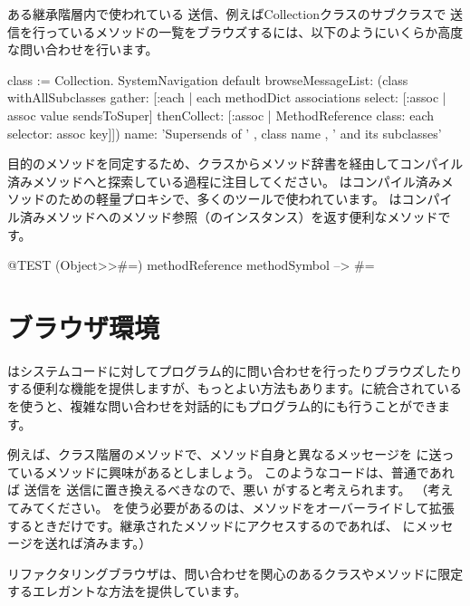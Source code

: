 \documentclass[a4paper,10pt,twoside]{book}
\begin{document}
ある継承階層内で使われている \super 送信、例えばCollectionクラスのサブクラスで \super 送信を行っているメソッドの一覧をブラウズするには、以下のようにいくらか高度な問い合わせを行います。
\begin{code}{}
class := Collection.
SystemNavigation default
  browseMessageList: (class withAllSubclasses gather: [:each |
    each methodDict associations
      select: [:assoc | assoc value sendsToSuper]
      thenCollect: [:assoc | MethodReference class: each selector: assoc key]])
  name: 'Supersends of ' , class name , ' and its subclasses'
\end{code}
目的のメソッドを同定するため、クラスからメソッド辞書を経由してコンパイル済みメソッドへと探索している過程に注目してください。
はコンパイル済みメソッドのための軽量プロキシで、多くのツールで使われています。
はコンパイル済みメソッドへのメソッド参照（のインスタンス）を返す便利なメソッドです。
\begin{code}{@TEST}
(Object>>#=) methodReference methodSymbol --> #=
\end{code}

\section{ブラウザ環境}

はシステムコードに対してプログラム的に問い合わせを行ったりブラウズしたりする便利な機能を提供しますが、もっとよい方法もあります。\pharo に統合されているを使うと、複雑な問い合わせを対話的にもプログラム的にも行うことができます。

例えば、クラス階層のメソッドで、メソッド自身と異なるメッセージを \super に送っているメソッドに興味があるとしましょう。
このようなコードは、普通であれば \super 送信を \self 送信に置き換えるべきなので、悪い  がすると考えられます。 （考えてみてください。 \super を使う必要があるのは、メソッドをオーバーライドして拡張するときだけです。継承されたメソッドにアクセスするのであれば、 \self にメッセージを送れば済みます。）

リファクタリングブラウザは、問い合わせを関心のあるクラスやメソッドに限定するエレガントな方法を提供しています。

\end{document}

